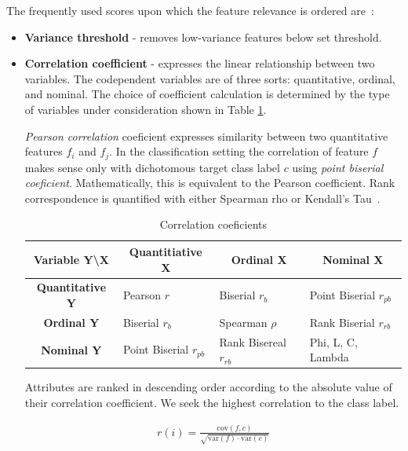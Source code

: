 The frequently used scores upon which the feature relevance is ordered are~\cite{nandi_condition_2019}: 
\begin{itemize}
\item \textbf{Variance threshold} - removes low-variance features below set threshold.
\item \textbf{Correlation coefficient} - expresses the linear relationship between two variables. The codependent variables are of three sorts: quantitative, ordinal, and nominal. The choice of coefficient calculation is determined by the type of variables under consideration shown in Table \ref{tab:corr-coef}. 

\emph{Pearson correlation} coeficient expresses similarity between two quantitative features $f_i$ and $f_j$. In the classification setting the correlation of feature $f$ makes sense only with dichotomous target class label $c$ using \emph{point biserial coeficient}. Mathematically, this is equivalent to the Pearson coefficient. Rank correspondence is quantified with either Spearman rho or Kendall's Tau~\cite{calkins_more_2005}.

\begin{table}[ht]
\renewcommand{\arraystretch}{1.5}
\begin{adjustbox}{width=\columnwidth,center}
\begin{tabular}{|c|l|l|l|}
\hline
\textbf{Variable Y\textbackslash{}X} & \multicolumn{1}{c|}{\textbf{Quantitiative X}} & \multicolumn{1}{c|}{\textbf{Ordinal X}} & \multicolumn{1}{c|}{\textbf{Nominal X}} \\ \hline
\textbf{Quantitative Y}              & Pearson $r$                                   & Biserial $r_b$                          & Point Biserial $r_{pb}$                 \\ \hline
\textbf{Ordinal Y}                   & Biserial $r_b$                                & Spearman $\rho$    & Rank Biserial $r_{rb}$                  \\ \hline
\textbf{Nominal Y}                   & Point Biserial $r_{pb}$                       & Rank Bisereal $r_{rb}$                  & Phi, L, C, Lambda                       \\ \hline
\end{tabular}
\end{adjustbox}
\caption{Correlation coeficients}
\label{tab:corr-coef}
\end{table}

Attributes are ranked in descending order according to the absolute value of their correlation coefficient. We seek the highest correlation to the class label.
\begin{ceqn}\begin{align}
r(i) = \frac{\mathrm{cov}(f, c)}{\sqrt{\mathrm{var}(f) \cdot \mathrm{var}(c)}}
\end{align}\end{ceqn}


\end{itemize}
